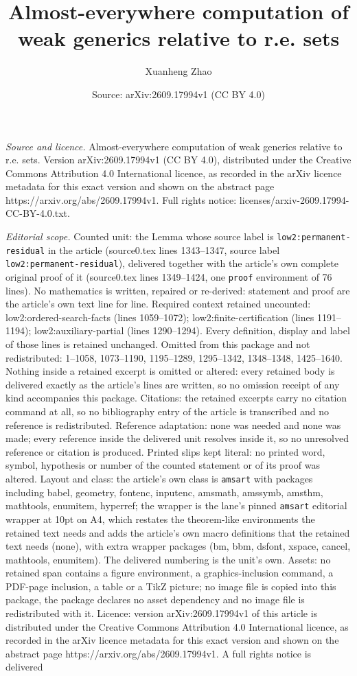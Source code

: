 \documentclass[10pt,a4paper]{amsart}
\title[Almost-everywhere computation of weak generics relative to r]{Almost-everywhere computation of weak generics relative to r.e. sets}
\author{Xuanheng Zhao}
\date{Source: arXiv:2609.17994v1 (CC BY 4.0)}
\begin{document}
\maketitle

\noindent\emph{Source and licence.} Almost-everywhere computation of weak generics relative to r.e. sets. Version arXiv:2609.17994v1 (CC BY 4.0), distributed under the Creative Commons Attribution 4.0 International licence, as recorded in the arXiv licence metadata for this exact version and shown on the abstract page https://arxiv.org/abs/2609.17994v1. Full rights notice: licenses/arxiv-2609.17994-CC-BY-4.0.txt.\par\smallskip

\noindent\textit{Editorial scope.} Counted unit: the Lemma whose source label is \texttt{low2:permanent-residual} in the article (source0.tex lines 1343--1347, source label \texttt{low2:permanent-residual}), delivered together with the article's own complete original proof of it (source0.tex lines 1349--1424, one \texttt{proof} environment of 76 lines). No mathematics is written, repaired or re-derived: statement and proof are the article's own text line for line. Required context retained uncounted: low2:ordered-search-facts (lines 1059--1072); low2:finite-certification (lines 1191--1194); low2:auxiliary-partial (lines 1290--1294). Every definition, display and label of those lines is retained unchanged. Omitted from this package and not redistributed: 1--1058, 1073--1190, 1195--1289, 1295--1342, 1348--1348, 1425--1640. Nothing inside a retained excerpt is omitted or altered: every retained body is delivered exactly as the article's lines are written, so no omission receipt of any kind accompanies this package. Citations: the retained excerpts carry no citation command at all, so no bibliography entry of the article is transcribed and no reference is redistributed. Reference adaptation: none was needed and none was made; every reference inside the delivered unit resolves inside it, so no unresolved reference or citation is produced. Printed slips kept literal: no printed word, symbol, hypothesis or number of the counted statement or of its proof was altered. Layout and class: the article's own class is \texttt{amsart} with packages including babel, geometry, fontenc, inputenc, amsmath, amssymb, amsthm, mathtools, enumitem, hyperref; the wrapper is the lane's pinned \texttt{amsart} editorial wrapper at 10pt on A4, which restates the theorem-like environments the retained text needs and adds the article's own macro definitions that the retained text needs (none), with extra wrapper packages (bm, bbm, dsfont, xspace, cancel, mathtools, enumitem). The delivered numbering is the unit's own. Assets: no retained span contains a figure environment, a graphics-inclusion command, a PDF-page inclusion, a table or a TikZ picture; no image file is copied into this package, the package declares no asset dependency and no image file is redistributed with it. Licence: version arXiv:2609.17994v1 of this article is distributed under the Creative Commons Attribution 4.0 International licence, as recorded in the arXiv licence metadata for this exact version and shown on the abstract page https://arxiv.org/abs/2609.17994v1. A full rights notice is delivered 
\end{document}
